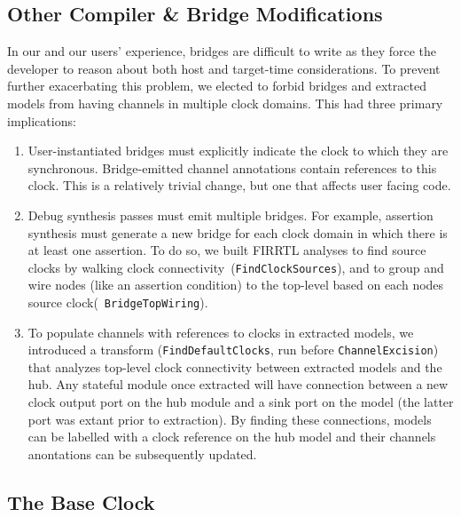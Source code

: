 \subsection{Other Compiler \& Bridge Modifications}

In our and our users' experience, bridges are difficult to write as they force
the developer to reason about both host and target-time considerations. To
prevent further exacerbating this problem, we elected to forbid bridges and
extracted models from having channels in multiple clock domains. This had three
primary implications:

\begin{enumerate}
\item User-instantiated bridges must explicitly indicate the clock to which
they are synchronous. Bridge-emitted channel annotations contain references to
this clock. This is a relatively trivial change, but one that affects user
facing code.

\item Debug synthesis passes must emit multiple bridges. For example, assertion
synthesis must generate a new bridge for each clock domain in which there is at
least one assertion. To do so, we built FIRRTL analyses to find source clocks
        by walking clock connectivity~(\texttt{FindClockSources}), and to group and wire
nodes (like an assertion condition) to the top-level based on each nodes source
clock(~\texttt{BridgeTopWiring}).

\item To populate channels with references to clocks in extracted models, we
introduced a transform (\texttt{FindDefaultClocks}, run before \texttt{ChannelExcision}) that analyzes top-level
clock connectivity between extracted models and the hub. Any stateful module
once extracted will have connection between a new clock output port on the hub
module and a sink port on the model (the latter port was extant prior to extraction). By
finding these connections, models can be labelled with a clock reference on the
hub model and their channels anontations can be subsequently updated.
\end{enumerate}

\subsection{The Base Clock}

